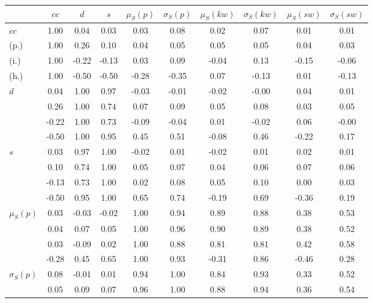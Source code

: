 \begin{table*}[h!]
\begin{center}
\begin{tabular}{| l | c | c | c | c | c | c | c | c | c |}\hline
 & $cc$ & $d$ & $s$ & $\mu_S(p)$ & $\sigma_S(p)$ & $\mu_S(kw)$ & $\sigma_S(kw)$ & $\mu_S(sw)$ & $\sigma_S(sw)$ \\\hline
$cc$ & 1.00  & 0.04  & 0.03  & 0.03  & 0.08  & 0.02  & 0.07  & 0.01  & 0.01 \\\hline
(p.) & 1.00  & 0.26  & 0.10  & 0.04  & 0.05  & 0.05  & 0.05  & 0.04  & 0.03 \\\hline
(i.) & 1.00  & -0.22  & -0.13  & 0.03  & 0.09  & -0.04  & 0.13  & -0.15  & -0.06 \\\hline
(h.) & 1.00  & -0.50  & -0.50  & -0.28  & -0.35  & 0.07  & -0.13  & 0.01  & -0.13 \\\hline
$d$ & 0.04  & 1.00  & 0.97  & -0.03  & -0.01  & -0.02  & -0.00  & 0.04  & 0.01 \\\hline
 & 0.26  & 1.00  & 0.74  & 0.07  & 0.09  & 0.05  & 0.08  & 0.03  & 0.05 \\\hline
 & -0.22  & 1.00  & 0.73  & -0.09  & -0.04  & 0.01  & -0.02  & 0.06  & -0.00 \\\hline
 & -0.50  & 1.00  & 0.95  & 0.45  & 0.51  & -0.08  & 0.46  & -0.22  & 0.17 \\\hline
$s$ & 0.03  & 0.97  & 1.00  & -0.02  & 0.01  & -0.02  & 0.01  & 0.02  & 0.01 \\\hline
 & 0.10  & 0.74  & 1.00  & 0.05  & 0.07  & 0.04  & 0.06  & 0.07  & 0.06 \\\hline
 & -0.13  & 0.73  & 1.00  & 0.02  & 0.08  & 0.05  & 0.10  & 0.00  & 0.03 \\\hline
 & -0.50  & 0.95  & 1.00  & 0.65  & 0.74  & -0.19  & 0.69  & -0.36  & 0.19 \\\hline
$\mu_S(p)$ & 0.03  & -0.03  & -0.02  & 1.00  & 0.94  & 0.89  & 0.88  & 0.38  & 0.53 \\\hline
 & 0.04  & 0.07  & 0.05  & 1.00  & 0.96  & 0.90  & 0.89  & 0.38  & 0.52 \\\hline
 & 0.03  & -0.09  & 0.02  & 1.00  & 0.88  & 0.81  & 0.81  & 0.42  & 0.58 \\\hline
 & -0.28  & 0.45  & 0.65  & 1.00  & 0.93  & -0.31  & 0.86  & -0.46  & 0.28 \\\hline
$\sigma_S(p)$ & 0.08  & -0.01  & 0.01  & 0.94  & 1.00  & 0.84  & 0.93  & 0.33  & 0.52 \\\hline
 & 0.05  & 0.09  & 0.07  & 0.96  & 1.00  & 0.88  & 0.94  & 0.36  & 0.54 \\\hline

\end{tabular}
\end{center}
\end{table*}

